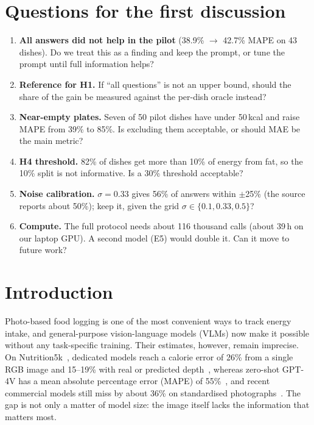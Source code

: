 \documentclass[twocolumn]{svjour3}
\begin{document}
\section*{Questions for the first discussion}
\label{sec:questions}
\begin{enumerate}
  \item \textbf{All answers did not help in the pilot} (38.9\% $\rightarrow$ 42.7\% MAPE on 43 dishes).
        Do we treat this as a finding and keep the prompt, or tune the prompt until full information helps?
  \item \textbf{Reference for H1.} If ``all questions'' is not an upper bound, should the share of the
        gain be measured against the per-dish oracle instead?
  \item \textbf{Near-empty plates.} Seven of 50 pilot dishes have under 50\,kcal and raise MAPE from 39\%
        to 85\%. Is excluding them acceptable, or should MAE be the main metric?
  \item \textbf{H4 threshold.} 82\% of dishes get more than 10\% of energy from fat, so the 10\% split is
        not informative. Is a 30\% threshold acceptable?
  \item \textbf{Noise calibration.} $\sigma=0.33$ gives 56\% of answers within $\pm$25\% (the source reports
        about 50\%); keep it, given the grid $\sigma\in\{0.1, 0.33, 0.5\}$?
  \item \textbf{Compute.} The full protocol needs about 116 thousand calls (about 39\,h on our laptop GPU).
        A second model (E5) would double it. Can it move to future work?
\end{enumerate}

\section{Introduction}
\label{sec:intro}

Photo-based food logging is one of the most convenient ways to track energy intake, and general-purpose
vision-language models (VLMs) now make it possible without any task-specific training. Their estimates,
however, remain imprecise. On Nutrition5k~\cite{thames2021nutrition5k}, dedicated models reach a calorie
error of 26\% from a single RGB image and 15--19\% with real or predicted
depth~\cite{thames2021nutrition5k,han2023dpf}, whereas zero-shot GPT-4V has a mean absolute percentage
error (MAPE) of 55\%~\cite{tanabe2024calorielava}, and recent commercial models still miss by about 36\%
on standardised photographs~\cite{fridolfsson2025llm}. The gap is not only a matter of model size: the
image itself lacks the information that matters most.
\end{document}
